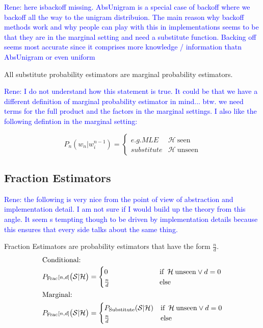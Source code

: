 \documentclass[11pt,a4paper]{article}
\newcommand{\Seq}{\mathcal{S}}
\newcommand{\Hist}{\mathcal{H}}
\newcommand{\rp}[1]{\textcolor{blue}{Rene: #1}}
\begin{document}
  \rp{here isbackoff missing. AbsUnigram is a special case of backoff where we
  backoff all the way to the unigram distribuion. The main reason why backoff
  methods work and why people can play with this in implementations seems to be
  that they are in the marginal setting and need a substitute function. Backing
  off seems most accurate since it comprises more knowledge / information thatn
  AbsUnigram or even uniform}

  All substitute probability estimators are marginal probability estimators.

  \rp{I do not understand how this statement is true. It could be that we have a
  different definition of marginal probability estimator in mind... btw. we need
  terms for the full product and the factors in the marginal settings. I also
  like the following defintion in the marginal setting:}

  \begin{equation}
    P_n(w_n|w_i^{n-1})= \begin{cases}
      e.g. MLE & \Hist \: \mathrm{seen}  \\
      substitute & \Hist \: \mathrm{unseen}
    \end{cases}
  \end{equation}


  \subsection{Fraction Estimators}

  \rp{the following is very nice from the point of view of abstraction and
  implementation detail. I am not sure if I would build up the theory from this
  angle. It seem s tempting though to be driven by implementation details
  because this ensures that every side talks about the same thing.}

  Fraction Estimators are probability estimators that have the form $\frac{n}{d}$.
  \begin{alignat}{2}
    \intertext{Conditional:}
    P_\mathrm{Frac}{\scriptstyle[n , d]}\big(\Seq | \Hist\big) &= \begin{cases}
      0\hphantom{_\mathrm{Substitute}(\Seq | \Hist)} & \text{if} \enspace \Hist \: \mathrm{unseen} \lor d = 0 \\
      \frac{n}{d} & \text{else}
    \end{cases} \\
    \intertext{Marginal:}
    P_\mathrm{Frac}{\scriptstyle[n , d]}\big(\Seq | \Hist\big) &= \begin{cases}
      P_\mathrm{Substitute}(\Seq | \Hist) & \text{if} \enspace \Hist \: \mathrm{unseen} \lor d = 0 \\
      \frac{n}{d} & \text{else}
    \end{cases}
  \end{alignat}
\end{document}
